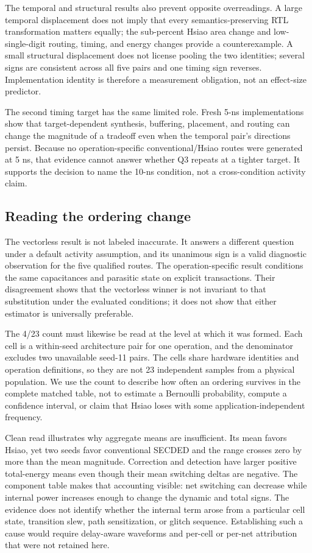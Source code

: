 \documentclass[conference,10pt]{IEEEtran}
\begin{document}
The temporal and structural results also prevent opposite overreadings. A large temporal displacement does not imply that every semantics-preserving RTL transformation matters equally; the sub-percent Hsiao area change and low-single-digit routing, timing, and energy changes provide a counterexample. A small structural displacement does not license pooling the two identities; several signs are consistent across all five pairs and one timing sign reverses. Implementation identity is therefore a measurement obligation, not an effect-size predictor.

The second timing target has the same limited role. Fresh 5-ns implementations show that target-dependent synthesis, buffering, placement, and routing can change the magnitude of a tradeoff even when the temporal pair's directions persist. Because no operation-specific conventional/Hsiao routes were generated at 5 ns, that evidence cannot answer whether Q3 repeats at a tighter target. It supports the decision to name the 10-ns condition, not a cross-condition activity claim.

\subsection{Reading the ordering change}
The vectorless result is not labeled inaccurate. It answers a different question under a default activity assumption, and its unanimous sign is a valid diagnostic observation for the five qualified routes. The operation-specific result conditions the same capacitances and parasitic state on explicit transactions. Their disagreement shows that the vectorless winner is not invariant to that substitution under the evaluated conditions; it does not show that either estimator is universally preferable.

The 4/23 count must likewise be read at the level at which it was formed. Each cell is a within-seed architecture pair for one operation, and the denominator excludes two unavailable seed-11 pairs. The cells share hardware identities and operation definitions, so they are not 23 independent samples from a physical population. We use the count to describe how often an ordering survives in the complete matched table, not to estimate a Bernoulli probability, compute a confidence interval, or claim that Hsiao loses with some application-independent frequency.

Clean read illustrates why aggregate means are insufficient. Its mean favors Hsiao, yet two seeds favor conventional SECDED and the range crosses zero by more than the mean magnitude. Correction and detection have larger positive total-energy means even though their mean switching deltas are negative. The component table makes that accounting visible: net switching can decrease while internal power increases enough to change the dynamic and total signs. The evidence does not identify whether the internal term arose from a particular cell state, transition slew, path sensitization, or glitch sequence. Establishing such a cause would require delay-aware waveforms and per-cell or per-net attribution that were not retained here.
\end{document}
